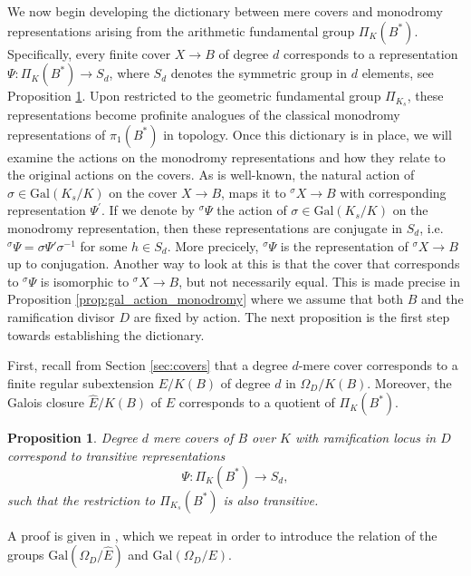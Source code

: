 \documentclass[10pt]{amsart}
\newtheorem{proposition}[theorem]{Proposition}
\theoremstyle{definition}
\newcommand{\Gal}{{ \mathrm{Gal}}}
\begin{document}
We now begin developing the dictionary between mere covers and monodromy representations arising from the arithmetic fundamental group $\Pi_K(B^*)$. 
Specifically, every finite cover $X\to B$ of degree $d$ corresponds to a representation $\Psi \colon \Pi_K(B^*) \to S_d$, where $S_d$ denotes the symmetric group in $d$ elements, see Proposition \ref{prop:merecovertrasnArith}. Upon restricted to the geometric fundamental group $\Pi_{K_s}$, these representations become profinite analogues of the classical monodromy representations of $\pi_1(B^*)$ in topology.
Once this dictionary is in place, we will examine the actions on the monodromy representations and how they relate to the original actions on the covers. 
As is well-known, the natural action of $\sigma \in \Gal(K_s / K)$ on the cover $X \rightarrow B$, maps it to $^\sigma \! X \rightarrow B$ with corresponding representation $\Psi^\prime$. 
If we denote by ${^\sigma \Psi}$ the action of $\sigma \in \Gal(K_s /K)$ on the monodromy representation, then these representations are conjugate in $S_d$, i.e. ${^\sigma \Psi} = \sigma \Psi' \sigma^{-1}$ for some $h \in S_d$. 
More precicely, ${^\sigma \Psi}$ is the representation of ${^\sigma X } \to B$ up to conjugation. Another way to look at this is that the cover that corresponds to ${^\sigma \Psi}$ is isomorphic to ${^\sigma X \to B}$, but not necessarily equal. This is made precise in Proposition \ref{prop:gal_action_monodromy} where we assume that both $B$ and the ramification divisor $D$ are fixed by action. 
The next proposition is the first step towards establishing the dictionary.

First, recall from Section \ref{sec:covers} that a degree $d$-mere cover corresponds to a finite regular subextension $E/K(B)$ of degree $d$ in $\Omega_D/K(B)$. Moreover, the Galois closure $\hat{E}/K(B)$ of $E$ corresponds to a quotient of $\Pi_K(B^*)$.
\begin{proposition}
  \label{prop:merecovertrasnArith}
Degree $d$ mere covers of $B$ over $K$ with ramification locus in $D$ correspond to transitive representations
\[
  \Psi \colon \Pi_K(B^*) \longrightarrow S_d,
\]
such that the restriction to $\Pi_{K_s}(B^*)$ is also transitive. 
\end{proposition}

A proof is given in \cite{DebesDouai97}, which we repeat in order to introduce the relation of the groups $\Gal(\Omega_D/\hat{E})$ and $\Gal(\Omega_D/E)$.
\end{document}
